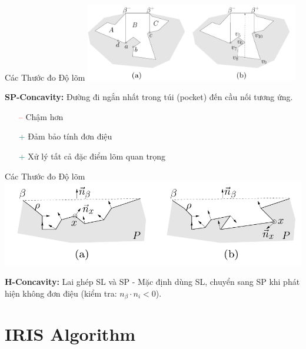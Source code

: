 \documentclass[aspectratio=169]{beamer}
\begin{document}
\begin{frame}{Các Thước đo Độ lõm}
    \centering
    \includegraphics[width=0.7\textwidth]{../imgs/sp_concavity.png}

    \vspace{0.5em}
    \textbf{SP-Concavity:} Đường đi ngắn nhất trong túi (pocket) đến cầu nối tương ứng.
    \begin{itemize}
        \item[\textcolor{red}{--}] Chậm hơn
        \item[\textcolor{teal}{+}] Đảm bảo tính đơn điệu
        \item[\textcolor{teal}{+}] Xử lý tất cả đặc điểm lõm quan trọng
    \end{itemize}

\end{frame}

\begin{frame}{Các Thước đo Độ lõm}
    \centering
    \includegraphics[width=0.7\linewidth]{../imgs/ACD-6.png}
    
    \vspace{0.5em}
    \textbf{H-Concavity:} Lai ghép SL và SP - Mặc định dùng SL, chuyển sang SP khi phát hiện không đơn điệu (kiểm tra: $n_\beta \cdot n_i < 0$).

\end{frame}

\section{IRIS Algorithm}
\end{document}
